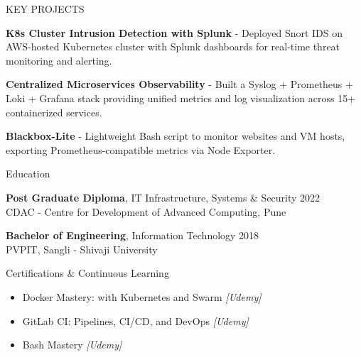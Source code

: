 \documentclass{resume} %
\begin{document}

\begin{rSection}{KEY PROJECTS}

\textbf{K8s Cluster Intrusion Detection with Splunk} - Deployed Snort IDS on AWS-hosted Kubernetes cluster with Splunk dashboards for real-time threat monitoring and alerting.

\textbf{Centralized Microservices Observability} - Built a Syslog + Prometheus + Loki + Grafana stack providing unified metrics and log visualization across 15+ containerized services.

\textbf{Blackbox-Lite} - Lightweight Bash script to monitor websites and VM hosts, exporting Prometheus-compatible metrics via Node Exporter.

\end{rSection} 


\begin{rSection}{Education}

{\bf Post Graduate Diploma}, IT Infrastructure, Systems \& Security \hfill {2022}\\
CDAC - Centre for Development of Advanced Computing, Pune

{\bf Bachelor of Engineering}, Information Technology \hfill {2018}\\
PVPIT, Sangli - Shivaji University

\end{rSection}

\begin{rSection}{Certifications \& Continuous Learning} 
\begin{itemize}
    \itemsep -3pt {} 
    \item Docker Mastery: with Kubernetes and Swarm \textit{[Udemy]}
    \item GitLab CI: Pipelines, CI/CD, and DevOps \textit{[Udemy]}
    \item Bash Mastery \textit{[Udemy]}
\end{itemize}
\end{rSection}
\end{document}
